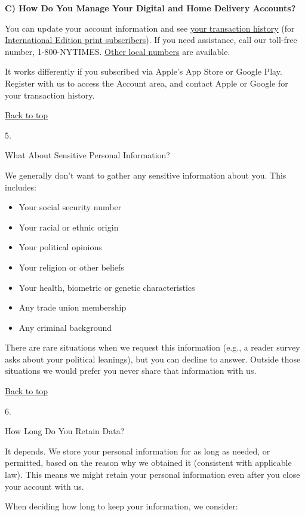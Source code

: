 \textbf{C) How Do You Manage Your Digital and Home Delivery Accounts?}

You can update your account information and see
\href{https://myaccount.nytimes3xbfgragh.onion}{your transaction
history} (for \href{https://customercare.inyt.com}{International Edition
print subscribers}). If you need assistance, call our toll-free number,
1-800-NYTIMES.
\href{https://subscribe.inyt.com/footer?requestAction=displayContactIht}{Other
local numbers} are available.

It works differently if you subscribed via Apple's App Store or Google
Play. Register with us to access the Account area, and contact Apple or
Google for your transaction history.

\href{app}{Back to top}

5.

What About Sensitive Personal Information?

We generally don't want to gather any sensitive information about you.
This includes:

\begin{itemize}
\tightlist
\item
  Your social security number
\item
  Your racial or ethnic origin
\item
  Your political opinions
\item
  Your religion or other beliefs
\item
  Your health, biometric or genetic characteristics
\item
  Any trade union membership
\item
  Any criminal background
\end{itemize}

There are rare situations when we request this information (e.g., a
reader survey asks about your political leanings), but you can decline
to answer. Outside those situations we would prefer you never share that
information with us.

\href{app}{Back to top}

6.

How Long Do You Retain Data?

It depends. We store your personal information for as long as needed, or
permitted, based on the reason why we obtained it (consistent with
applicable law). This means we might retain your personal information
even after you close your account with us.

When deciding how long to keep your information, we consider:

